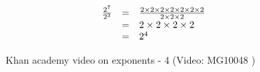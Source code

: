     \begin{equation}
    \begin{array}{ccl}\hfill \frac{{2}^{7}}{{2}^{3}}& =& \frac{2\ensuremath{\times}2\ensuremath{\times}2\ensuremath{\times}2\ensuremath{\times}2\ensuremath{\times}2\ensuremath{\times}2}{2\ensuremath{\times}2\ensuremath{\times}2}\hfill \\ & =& 2\ensuremath{\times}2\ensuremath{\times}2\ensuremath{\times}2\hfill \\ & =& {2}^{4}\hfill \hfill \end{array}
      \end{equation}
\label{m38359*eip-693}
    \setcounter{subfigure}{0}
	\begin{figure}[H] %
    \textnormal{Khan academy video on exponents - 4}\vspace{.1in} \nopagebreak
  \label{m38359*yt-media6}\label{m38359*yt-video6}
             { (Video:  MG10048 )}
      \vspace{2pt}
    \vspace{.1in}
 \end{figure}       


